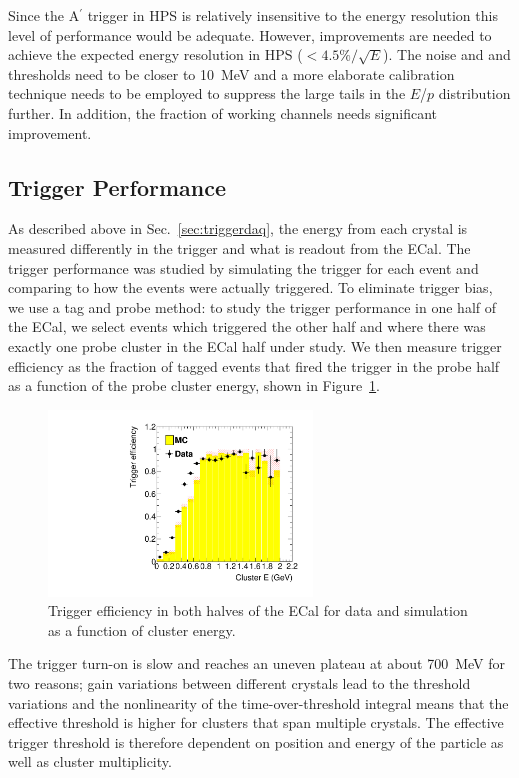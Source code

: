 \documentclass[final,3p,times,twocolumn]{elsarticle}
\newcommand{\Aprime}{A\ensuremath{^\prime}}
\begin{document}
Since the \Aprime{} trigger in HPS is relatively insensitive to the energy resolution this level of performance 
would be adequate. However, improvements are needed to achieve the expected energy resolution in HPS 
($<4.5\%/\sqrt{E}$). The noise and and thresholds need to be closer to 10~MeV and a more elaborate 
calibration technique needs to be employed to suppress the large tails in the $E$/$p$ distribution further. 
In addition, the fraction of working channels needs significant improvement.

\subsection{Trigger Performance}
As described above in Sec.~\ref{sec:triggerdaq}, the energy from each 
crystal is measured differently in the trigger and what is readout from the ECal. 
The trigger performance was studied by simulating the 
trigger for each event and comparing to how the events were actually triggered.
To eliminate trigger bias, we use a tag and probe method: to study the trigger performance in one half 
of the ECal, we select 
events which triggered the other half and where there was exactly one probe cluster in the ECal half 
under study. We then measure trigger efficiency as the fraction of tagged events that fired the trigger in 
the probe half as a function of the probe cluster energy, shown in Figure~\ref{fig:turnon}. 
\begin{figure}[ht]
\begin{center}
	\includegraphics[width=7cm]{h_cl_E_probedata_eff_bay_h_cl_E_probeMC_eff_bay_dataMC_1351-v7-trig-tagBot.pdf}
	\caption{\small Trigger efficiency in both halves of the ECal for data and simulation as a 
	function of cluster energy.
\label{fig:turnon}}
\end{center}
\end{figure}
The trigger turn-on is slow and reaches an uneven plateau at about 700~MeV for two reasons;  
gain variations between different crystals lead to the threshold variations and the nonlinearity of 
the time-over-threshold integral means that the effective threshold is higher for clusters that span 
multiple crystals. The effective trigger threshold is therefore dependent on position and energy of 
the particle as well as cluster multiplicity. 
\end{document}

